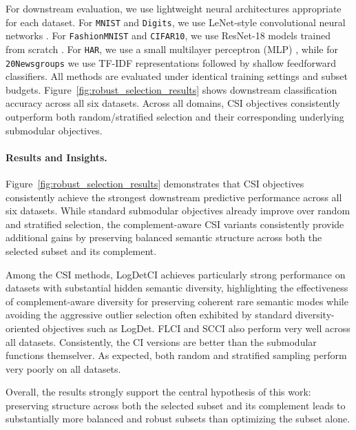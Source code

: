 \documentclass[11pt]{article}
\begin{document}
For downstream evaluation, we use lightweight neural architectures appropriate for each dataset. For \texttt{MNIST} and \texttt{Digits}, we use LeNet-style convolutional neural networks \cite{lecun1998mnist}. For \texttt{FashionMNIST} and \texttt{CIFAR10}, we use ResNet-18 models trained from scratch \cite{he2016deep}. For \texttt{HAR}, we use a small multilayer perceptron (MLP) \cite{rumelhart1986learning}, while for \texttt{20Newsgroups} we use TF-IDF representations \cite{salton1988term} followed by shallow feedforward classifiers. All methods are evaluated under identical training settings and subset budgets. Figure~\ref{fig:robust_selection_results} shows downstream classification accuracy across all six datasets. Across all domains, CSI objectives consistently outperform both random/stratified selection and their corresponding underlying submodular objectives.

\paragraph{Results and Insights.}

Figure~\ref{fig:robust_selection_results} demonstrates that CSI objectives consistently achieve the strongest downstream predictive performance across all six datasets. While standard submodular objectives already improve over random and stratified selection, the complement-aware CSI variants consistently provide additional gains by preserving balanced semantic structure across both the selected subset and its complement.

Among the CSI methods, LogDetCI achieves particularly strong performance on datasets with substantial hidden semantic diversity, highlighting the effectiveness of complement-aware diversity for preserving coherent rare semantic modes while avoiding the aggressive outlier selection often exhibited by standard diversity-oriented objectives such as LogDet. FLCI and SCCI also perform very well across all datasets. Consistently, the CI versions are better than the submodular functions themselver. As expected, both random and stratified sampling perform very poorly on all datasets.

Overall, the results strongly support the central hypothesis of this work: preserving structure across both the selected subset and its complement leads to substantially more balanced and robust subsets than optimizing the subset alone.
\end{document}
